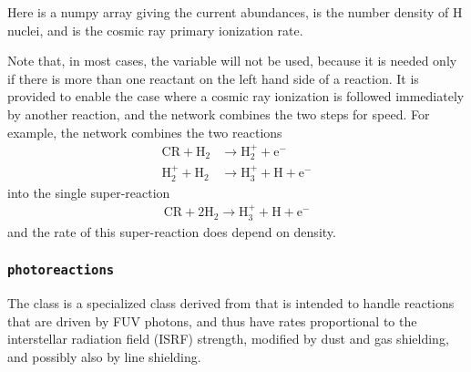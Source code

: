 \documentclass[letterpaper,10pt,english]{sphinxmanual}
\begin{document}
Here  is a numpy array giving the current abundances,  is
the number density of H nuclei, and  is the cosmic ray
primary ionization rate.

Note that, in most cases, the variable  will not be used, because
it is needed only if there is more than one reactant on the left hand
side of a reaction. It is provided to enable the case where a cosmic
ray ionization is followed immediately by another reaction, and the
network combines the two steps for speed. For example, the
{\hyperref[chemistry:sssec\string-nl99]{}} network combines the two reactions
\begin{equation*}
\begin{split}\mathrm{CR} + \mathrm{H}_2 & \rightarrow \mathrm{H}_2^+ +
\mathrm{e}^- \\
\mathrm{H}_2^+ + \mathrm{H}_2 & \rightarrow \mathrm{H}_3^+ +
\mathrm{H} + \mathrm{e}^-\end{split}
\end{equation*}
into the single super-reaction
\begin{equation*}
\begin{split}\mathrm{CR} + 2\mathrm{H}_2 \rightarrow \mathrm{H}_3^+ +
\mathrm{H} + \mathrm{e}^-\end{split}
\end{equation*}
and the rate of this super-reaction does depend on density.


\subsubsection{\texttt{photoreactions}}
\label{chemistry:photoreactions}
The  class is a specialized class derived from
{\hyperref[chemistry:ssssec\string-reaction\string-matrix]{}} that is intended to handle reactions
that are driven by FUV photons, and thus have rates proportional to
the interstellar radiation field (ISRF) strength, modified by dust and
gas shielding, and possibly also by line shielding.
\end{document}
